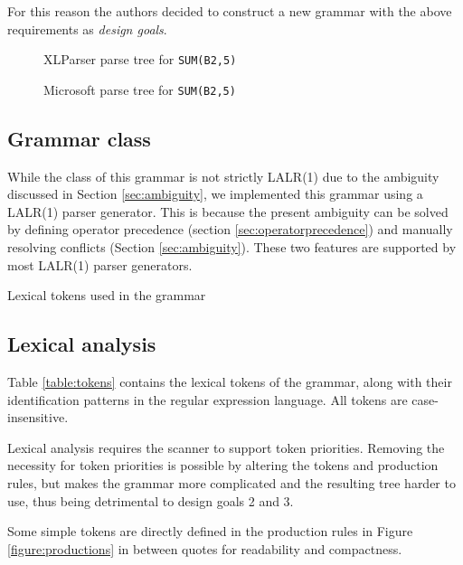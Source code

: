 \documentclass[conference]{IEEEtran}
\begin{document}
For this reason the authors decided to construct a new grammar with the above requirements as \emph{design goals}.

\begin{figure}
	\caption{XLParser parse tree for \texttt{SUM(B2,5)}}
	\label{figure:parsetree-xlparser}
	\centering
	\scalebox{.7}{
	
	}
	\hspace{3.5em}
\end{figure}

\begin{figure}
	\caption{Microsoft parse tree for \texttt{SUM(B2,5)}}
	\label{figure:parsetree-ms}
	\centering
	\scalebox{.7}{
	
	}
\end{figure}


\subsection{Grammar class}

While the class of this grammar is not strictly LALR(1) due to the ambiguity discussed in Section \ref{sec:ambiguity}, we implemented this grammar using a LALR(1) parser generator.
This is because the present ambiguity can be solved by defining operator precedence (section \ref{sec:operatorprecedence}) and manually resolving conflicts (Section \ref{sec:ambiguity}).
These two features are supported by most LALR(1) parser generators.
\begin{table}
\caption{Lexical tokens used in the grammar}
\label{table:tokens}

\end{table}

\subsection{Lexical analysis}

Table \ref{table:tokens} contains the lexical tokens of the grammar, along with their identification patterns in the regular expression language. All tokens are case-insensitive.

Lexical analysis requires the scanner to support token priorities. Removing the necessity for token priorities is possible by altering the tokens and production rules, but makes the grammar more complicated and the resulting tree harder to use, thus being detrimental to design goals 2 and 3.

Some simple tokens are directly defined in the production rules in Figure \ref{figure:productions} in between quotes for readability and compactness.
\end{document}
